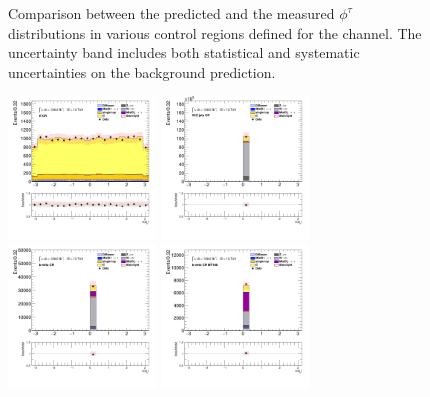 \begin{figure}[!htp]
\begin{center}
			\end{center}
			\caption{
			Comparison between the predicted and the measured $\phi^{\tau}$ distributions in various control regions defined for the \taujets channel. The uncertainty band includes both statistical and systematic uncertainties on the background prediction. 
			}
			\label{fig:bkg-tau-phi-taujets}
		\end{figure}

		\begin{figure}[!htp]
			\begin{center}    
			\includegraphics[width=0.35\textwidth]{chapters/chapter6_HPlus/images/taujets/bjet_0_phi_TTBAR.png}
			\includegraphics[width=0.35\textwidth]{chapters/chapter6_HPlus/images/taujets/bjet_0_phi_WJETS.png} \\
			\includegraphics[width=0.35\textwidth]{chapters/chapter6_HPlus/images/taujets/bjet_0_phi_BVETO.png}
			\includegraphics[width=0.35\textwidth]{chapters/chapter6_HPlus/images/taujets/bjet_0_phi_BVETO_MT100.png} \\

\end{center}
\end{figure}
